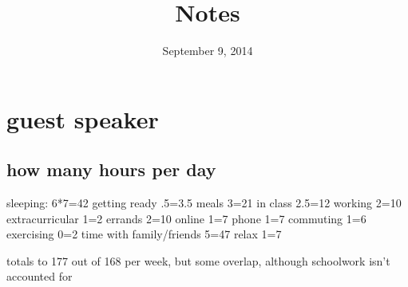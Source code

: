 \documentclass[letterpaper]{article}
\begin{document}
\title{Notes}
\date{September 9, 2014}
\maketitle
\section*{guest speaker}
\subsection*{how many hours per day}
sleeping: 6*7=42
getting ready .5=3.5
meals 3=21
in class 2.5=12
working 2=10
extracurricular 1=2
errands 2=10
online 1=7
phone 1=7
commuting 1=6
exercising 0=2
time with family/friends 5=47
relax 1=7

totals to 177 out of 168 per week, but some overlap, although schoolwork isn't accounted for
\end{document}
